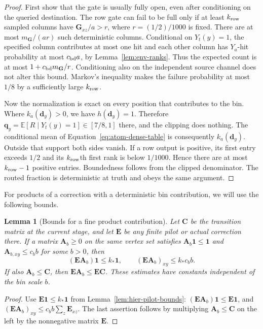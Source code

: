 \documentclass[11pt]{article}
\numberwithin{equation}{section}
\newtheorem{lemma}[theorem]{Lemma}
\theoremstyle{definition}
\theoremstyle{remark}
\begin{document}
\begin{proof}
First show that the gate is usually fully open, even after conditioning on the queried destination. The row gate can fail to be full only if at least ${k_{\rm row}}$ sampled columns
have ${\mathbf{G}}_{xz}/a>r$, where $r=(1/2)/1000$ is fixed.
There are at most ${m}_{\mathbf{G}}/(ar)$ such deterministic columns.
Conditional on $Y_t(y)=1$, the specified column contributes at most one
hit and each other column has $Y_a$-hit probability at most ${c_{\rm bd}} a$, by
Lemma~\ref{lem:env-ranks}.  Thus the expected count is at most
$1+{c_{\rm bd}}{m}_{\mathbf{G}}/r$.  Conditioning also on the independent source channel does
not alter this bound.  Markov's inequality makes the failure probability
at most $1/8$ by a sufficiently large ${k_{\rm row}}$.

Now the normalization is exact on every position that contributes to the bin. Where $k_a({\mathbf{d}}_y)>0$, we have $h({\mathbf{d}}_y)=1$.  Therefore
${\mathbf{q}}_y=\mathbb E[R\mid Y_t(y)=1]\in[7/8,1]$ there, and the clipping
does nothing.  The conditional mean of Equation~\eqref{eq:atom-dense-table}
is consequently $k_a({\mathbf{d}}_y)$.  Outside that support both sides vanish.
If a row output is positive, its first entry exceeds $1/2$ and its
${k_{\rm row}}$th first rank is below $1/1000$.  Hence there are at most ${k_{\rm row}}-1$
positive entries.  Boundedness follows from the clipped denominator.  The routed
fraction is deterministic at truth and obeys the same argument.
\end{proof}

For products of a correction with a deterministic bin contribution, we
will use the following bounds.

\begin{lemma}[Bounds for a fine product contribution]
\label{lem:hier-bin-products}
Let ${\mathbf{C}}$ be the transition matrix at the current stage, and let ${\mathbf{E}}$ be
any finite pilot or actual correction there.  If a matrix ${\mathbf{A}}_b\geq0$
on the same vertex set satisfies ${\mathbf{A}}_b\mathbf 1\leq\mathbf 1$ and
${\mathbf{A}}_{b,xy}\leq c_b b$ for some $b>0$, then
\[
 ({\mathbf{E}}{\mathbf{A}}_b)\mathbf 1\leq k_*\mathbf 1,
 \qquad ({\mathbf{E}}{\mathbf{A}}_b)_{xy}\leq k_*c_b b.
\]
If also ${\mathbf{A}}_b\leq {\mathbf{C}}$, then ${\mathbf{E}}{\mathbf{A}}_b\leq {\mathbf{E}}{\mathbf{C}}$.  These estimates have constants
independent of the bin scale $b$.
\end{lemma}

\begin{proof}
Use ${\mathbf{E}}\mathbf 1\leq k_*\mathbf 1$ from
Lemma~\ref{lem:hier-pilot-bounds}:
$({\mathbf{E}}{\mathbf{A}}_b)\mathbf 1\leq {\mathbf{E}}\mathbf 1$, and
$({\mathbf{E}}{\mathbf{A}}_b)_{xy}\leq c_b b\sum_z{\mathbf{E}}_{xz}$.  The last assertion follows by
multiplying ${\mathbf{A}}_b\leq {\mathbf{C}}$ on the left by the nonnegative matrix ${\mathbf{E}}$.
\end{proof}
\end{document}
